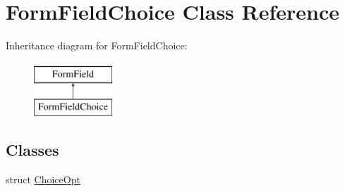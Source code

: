 \hypertarget{class_form_field_choice}{}\section{Form\+Field\+Choice Class Reference}
\label{class_form_field_choice}
Inheritance diagram for Form\+Field\+Choice\+:\begin{figure}[H]
\begin{center}
\leavevmode
\includegraphics[height=2.000000cm]{class_form_field_choice}
\end{center}
\end{figure}
\subsection*{Classes}
\begin{DoxyCompactItemize}
\item 
struct \hyperlink{struct_form_field_choice_1_1_choice_opt}{Choice\+Opt}
\end{DoxyCompactItemize}

